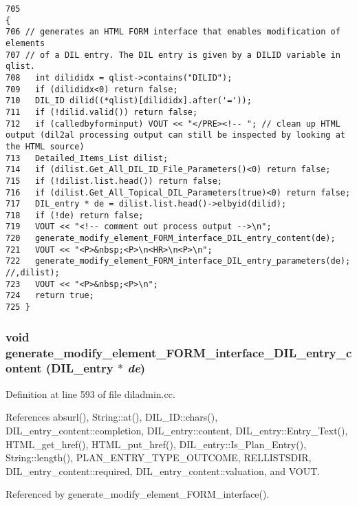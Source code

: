 \footnotesize\begin{verbatim}705                                                                        {
706 // generates an HTML FORM interface that enables modification of elements
707 // of a DIL entry. The DIL entry is given by a DILID variable in qlist.
708   int dilididx = qlist->contains("DILID");
709   if (dilididx<0) return false;
710   DIL_ID dilid((*qlist)[dilididx].after('='));
711   if (!dilid.valid()) return false;
712   if (calledbyforminput) VOUT << "</PRE><!-- "; // clean up HTML output (dil2al processing output can still be inspected by looking at the HTML source)
713   Detailed_Items_List dilist;
714   if (dilist.Get_All_DIL_ID_File_Parameters()<0) return false;
715   if (!dilist.list.head()) return false;
716   if (dilist.Get_All_Topical_DIL_Parameters(true)<0) return false;
717   DIL_entry * de = dilist.list.head()->elbyid(dilid);
718   if (!de) return false;
719   VOUT << "<!-- comment out process output -->\n";
720   generate_modify_element_FORM_interface_DIL_entry_content(de);
721   VOUT << "<P>&nbsp;<P>\n<HR>\n<P>\n";
722   generate_modify_element_FORM_interface_DIL_entry_parameters(de); //,dilist);
723   VOUT << "<P>&nbsp;<P>\n";
724   return true;
725 }
\end{verbatim}\normalsize 
{}
\subsubsection{\setlength{\rightskip}{0pt plus 5cm}void generate\_\-modify\_\-element\_\-FORM\_\-interface\_\-DIL\_\-entry\_\-content ({\bf DIL\_\-entry} $\ast$ {\em de})}\label{diladmin_8cc_a7}




Definition at line 593 of file diladmin.cc.

References absurl(), String::at(), DIL\_\-ID::chars(), DIL\_\-entry\_\-content::completion, DIL\_\-entry::content, DIL\_\-entry::Entry\_\-Text(), HTML\_\-get\_\-href(), HTML\_\-put\_\-href(), DIL\_\-entry::Is\_\-Plan\_\-Entry(), String::length(), PLAN\_\-ENTRY\_\-TYPE\_\-OUTCOME, RELLISTSDIR, DIL\_\-entry\_\-content::required, DIL\_\-entry\_\-content::valuation, and VOUT.

Referenced by generate\_\-modify\_\-element\_\-FORM\_\-interface().



